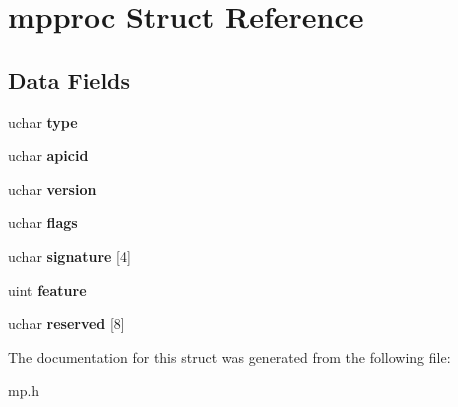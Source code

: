\hypertarget{structmpproc}{}\section{mpproc Struct Reference}
\label{structmpproc}
\subsection*{Data Fields}
\begin{DoxyCompactItemize}
\item 
uchar {\bfseries type}\hypertarget{structmpproc_acd7371100bf5624c8eafe1280826f358}{}\label{structmpproc_acd7371100bf5624c8eafe1280826f358}

\item 
uchar {\bfseries apicid}\hypertarget{structmpproc_a935db2a1561da721c867f4b82c51d04d}{}\label{structmpproc_a935db2a1561da721c867f4b82c51d04d}

\item 
uchar {\bfseries version}\hypertarget{structmpproc_a6d7948bc046404527c0eec71e3e93209}{}\label{structmpproc_a6d7948bc046404527c0eec71e3e93209}

\item 
uchar {\bfseries flags}\hypertarget{structmpproc_abac8cdeb6e601ce8e5bf343c8efb3680}{}\label{structmpproc_abac8cdeb6e601ce8e5bf343c8efb3680}

\item 
uchar {\bfseries signature} \mbox{[}4\mbox{]}\hypertarget{structmpproc_a2e18fc2c01b252da2c0d671fdce95eb5}{}\label{structmpproc_a2e18fc2c01b252da2c0d671fdce95eb5}

\item 
uint {\bfseries feature}\hypertarget{structmpproc_a62dc15542eee0797a4636b701439b6d9}{}\label{structmpproc_a62dc15542eee0797a4636b701439b6d9}

\item 
uchar {\bfseries reserved} \mbox{[}8\mbox{]}\hypertarget{structmpproc_a94bbb1f4794bcf6126fb36520f668134}{}\label{structmpproc_a94bbb1f4794bcf6126fb36520f668134}

\end{DoxyCompactItemize}


The documentation for this struct was generated from the following file\+:\begin{DoxyCompactItemize}
\item 
mp.\+h\end{DoxyCompactItemize}
